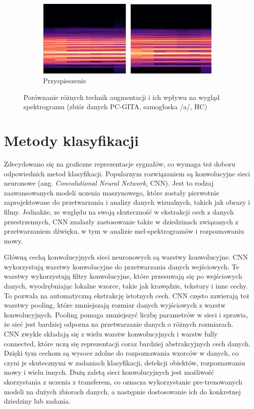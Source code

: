 \begin{figure}[ht]
    \begin{subfigure}{0.7\textwidth}
        \includegraphics[width=\linewidth]{./img/augmentation/speed}
        \caption{Przyspieszenie\@}
        \label{fig:speed}
    \end{subfigure}

    \caption{Porównanie różnych technik augmentacji i ich wpływu na wygląd spektrogramu (zbiór danych PC-GITA, samogłoska /a/, HC)}
    \label{fig:augumentacja}
\end{figure}


\section{Metody klasyfikacji}
\label{sec:klasyfikacja}

Zdecydowano się na graficzne reprezentacje sygnałów, co wymaga też doboru odpowiednich metod klasyfikacji.
Popularnym rozwiązaniem są konwolucyjne sieci neuronowe (ang. \emph{Convolutional Neural Network}, CNN).
Jest to rodzaj zaawansowanych modeli uczenia maszynowego, które zostały pierwotnie zaprojektowane do przetwarzania i analizy danych wizualnych, takich jak obrazy i filmy.
Jednakże, ze względu na swoją skuteczność w ekstrakcji cech z danych przestrzennych, CNN znalazły zastosowanie także w dziedzinach związanych z przetwarzaniem dźwięku, w tym w analizie mel-spektrogramów i rozpoznawaniu mowy.

Główną cechą konwolucyjnych sieci neuronowych są warstwy konwolucyjne.
CNN wykorzystują warstwy konwolucyjne do przetwarzania danych wejściowych.
Te warstwy wykorzystują filtry konwolucyjne, które przesuwają się po wejściowych danych, wyodrębniając lokalne wzorce, takie jak krawędzie, tekstury i inne cechy.
To pozwala na automatyczną ekstrakcję istotnych cech.
CNN często zawierają też warstwy pooling, które zmniejszają rozmiar danych wyjściowych z warstw konwolucyjnych.
Pooling pomaga zmniejszyć liczbę parametrów w sieci i sprawia, że sieć jest bardziej odporna na przetwarzanie danych o różnych rozmiarach.
CNN zwykle składają się z wielu warstw konwolucyjnych i warstw fully connected, które uczą się reprezentacji coraz bardziej abstrakcyjnych cech danych.
Dzięki tym cechom są wysoce zdolne do rozpoznawania wzorców w danych, co czyni je skutecznymi w zadaniach klasyfikacji, detekcji obiektów, rozpoznawaniu mowy i wielu innych.
Dużą zaletą sieci konwolucyjnych jest możliwość skorzystania z uczenia z transferem, co oznacza wykorzystanie pre-trenowanych modeli na dużych zbiorach danych, a następnie dostosowanie ich do konkretnej dziedziny lub zadania.

